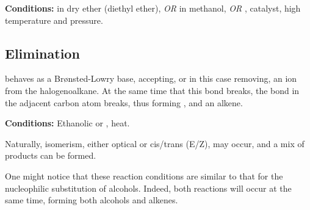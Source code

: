 				\vspace{1.5em}
				\vbox{\textbf{Conditions:}	\tabto{35mm} in dry ether (diethyl ether), \textit{OR}
											\tabto{35mm}\ch{NaBH4} in methanol, \textit{OR}
											\tabto{35mm},  catalyst, high temperature and pressure.}







		\pagebreak
		\hypertarget{HydrogenHalideElimination}{}
		\subsection{Elimination}

			 behaves as a Brønsted-Lowry base, accepting, or in this case removing, an  ion from the halogenoalkane.
			At the same time that this  bond breaks, the  bond in the adjacent carbon atom breaks, thus forming
			, and an alkene.

			\vspace{1.5em}
			\vbox{\textbf{Conditions:}	\tabto{35mm}Ethanolic  or , heat.}


			Naturally, isomerism, either optical or cis/trans (E/Z), may occur, and a mix of products can be formed.

			One might notice that these reaction conditions are similar to that for the nucleophilic substitution of alcohols. Indeed,
			both reactions will occur at the same time, forming both alcohols and alkenes.

